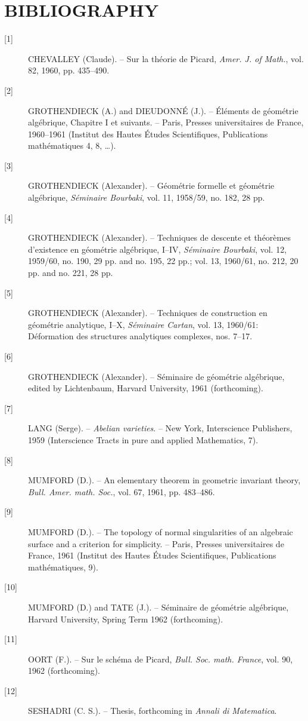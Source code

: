 \section*{BIBLIOGRAPHY}

\begin{description}
\item[{[1]}] CHEVALLEY (Claude). -- Sur la théorie de Picard,
\emph{Amer. J. of Math.}, vol. 82, 1960, pp. 435--490.

\item[{[2]}] GROTHENDIECK (A.) and DIEUDONNÉ (J.). -- Éléments de géométrie
algébrique, Chapitre I et suivants. -- Paris, Presses universitaires de France,
1960--1961 (Institut des Hautes Études Scientifiques, Publications
mathématiques 4, 8, \ldots).

\item[{[3]}] GROTHENDIECK (Alexander). -- Géométrie formelle et géométrie
algébrique, \emph{Séminaire Bourbaki}, vol. 11, 1958/59, no. 182, 28 pp.

\item[{[4]}] GROTHENDIECK (Alexander). -- Techniques de descente et théorèmes
d'existence en géométrie algébrique, I--IV, \emph{Séminaire Bourbaki}, vol. 12,
1959/60, no. 190, 29 pp. and no. 195, 22 pp.; vol. 13, 1960/61, no. 212,
20 pp. and no. 221, 28 pp.

\item[{[5]}] GROTHENDIECK (Alexander). -- Techniques de construction en
géométrie analytique, I--X, \emph{Séminaire Cartan}, vol. 13, 1960/61:
Déformation des structures analytiques complexes, nos. 7--17.

\item[{[6]}] GROTHENDIECK (Alexander). -- Séminaire de géométrie algébrique,
edited by Lichtenbaum, Harvard University, 1961 (forthcoming).

\item[{[7]}] LANG (Serge). -- \emph{Abelian varieties}. -- New York,
Interscience Publishers, 1959 (Interscience Tracts in pure and applied
Mathematics, 7).

\item[{[8]}] MUMFORD (D.). -- An elementary theorem in geometric invariant
theory, \emph{Bull. Amer. math. Soc.}, vol. 67, 1961, pp. 483--486.

\item[{[9]}] MUMFORD (D.). -- The topology of normal singularities of an
algebraic surface and a criterion for simplicity. -- Paris, Presses
universitaires de France, 1961 (Institut des Hautes Études Scientifiques,
Publications mathématiques, 9).

\item[{[10]}] MUMFORD (D.) and TATE (J.). -- Séminaire de géométrie
algébrique, Harvard University, Spring Term 1962 (forthcoming).

\item[{[11]}] OORT (F.). -- Sur le schéma de Picard,
\emph{Bull. Soc. math. France}, vol. 90, 1962 (forthcoming).

\item[{[12]}] SESHADRI (C. S.). -- Thesis, forthcoming in
\emph{Annali di Matematica}.
\end{description}

\par\smallskip
\begingroup\footnotesize
\endgroup
